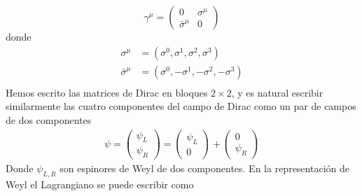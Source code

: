 \begin{equation}
  \gamma^\mu=\begin{pmatrix}
    0&\sigma^\mu\\
    \bar{\sigma}^\mu & 0
  \end{pmatrix}
\end{equation}
donde
\begin{align}
  \sigma^\mu&=(\sigma^0,\sigma^1,\sigma^2,\sigma^3)\nonumber\\
  \bar{\sigma}^\mu&=(\sigma^0,-\sigma^1,-\sigma^2,-\sigma^3)\nonumber\\
\end{align}
Hemos escrito las matrices de Dirac en bloques $2\times2$, y es natural escribir similarmente las cuatro componentes del campo de Dirac como un par de campos de dos componentes
\begin{align}
  \psi=  \begin{pmatrix}
    \psi_L\\
    \psi_R    
  \end{pmatrix}=\begin{pmatrix}
    \psi_L\\
    0   
  \end{pmatrix}+\begin{pmatrix}
    0\\
    \psi_R    
  \end{pmatrix}
\end{align}
Donde $\psi_{L,R}$ son espinores de Weyl de dos componentes. En la representaci\'on de Weyl el Lagrangiano se puede escribir como
